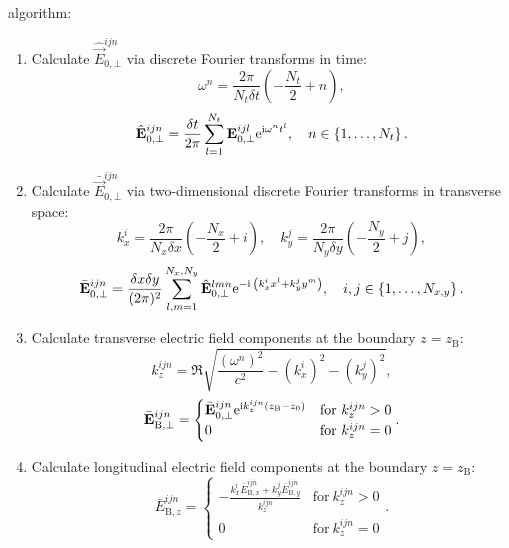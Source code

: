 algorithm:
\begin{enumerate}
	\item Calculate $ \hat{\vec{E}}_{0, \bot}^{ijn} $ via discrete Fourier transforms in time:
	\begin{equation}
	\omega^n = \frac{2 \pi}{N_t \delta t} \left( -\frac{N_t}{2} + n \right),
	\end{equation}
	\begin{equation}
	\hat{\mathbf{E}}_{0, \bot}^{ijn} = \frac{\delta t}{2 \pi} \sum_{l=1}^{N_t} \mathbf{E}_{0, \bot}^{ijl} \mathrm{e}^{\mathrm{i} \omega^n t^l}, \quad n \in \left\lbrace 1, \dots, N_t \right\rbrace.
	\end{equation}
	\item Calculate $ \bar{\vec{E}}_{0, \bot}^{ijn} $ via two-dimensional discrete Fourier transforms in transverse space:
	\begin{equation}
	k_x^i = \frac{2 \pi}{N_x \delta x} \left( - \frac{N_x}{2} + i\right), \quad k_y^j = \frac{2 \pi}{N_y \delta y} \left( - \frac{N_y}{2} + j\right),
	\end{equation}
	\begin{equation}
	\bar{\mathbf{E}}_{0, \bot}^{ijn} = \frac{\delta x \delta y}{(2 \pi)^2} \sum_{l, m = 1}^{N_x, N_y} \hat{\mathbf{E}}_{0, \bot}^{lmn} \mathrm{e}^{- \mathrm{i} \: \left(k_x^i x^l + k_y^j y^m \right)}, \quad i, j \in \left\lbrace 1, \dots, N_{x, y} \right\rbrace.
	\end{equation}
	\item Calculate transverse electric field components at the boundary $ z = z_\mathrm{B} $:
	\begin{equation}
	k_z^{ijn} = \Re \sqrt{\frac{(\omega^n)^2}{c^2} - (k_x^i)^2 - (k_y^j)^2},
	\end{equation}
	\begin{equation}
	\bar{\mathbf{E}}_{\mathrm{B}, \bot}^{ijn} =
	\begin{cases} \bar{\mathbf{E}}_{0, \bot}^{ijn} \mathrm{e}^{\mathrm{i} k_z^{ijn}(z_\mathrm{B} - z_0)} & \text{for} \ k_z^{ijn} > 0 \\ 0 & \text{for} \ k_z^{ijn} = 0 \end{cases}.
	\end{equation}
	\item Calculate longitudinal electric field components at the boundary $ z = z_\mathrm{B} $:
	\begin{equation}
	\bar{E}_{\mathrm{B}, z}^{ijn} = \begin{cases} -\frac{k_x^i \bar{E}_{\mathrm{B}, x}^{ijn} + k_y^j \bar{E}_{\mathrm{B}, y}^{ijn}}{k_z^{ijn}} & \text{for} \ k_z^{ijn} > 0 \\ 0 & \text{for} \ k_z^{ijn} = 0 \end{cases}.

\end{equation}
\end{enumerate}
